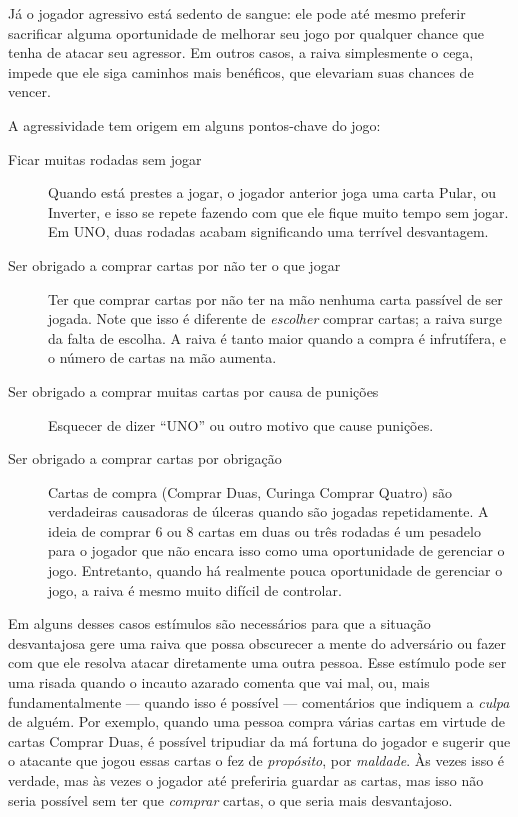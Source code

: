 Já o jogador agressivo está sedento de sangue: ele pode até mesmo preferir sacrificar alguma oportunidade de melhorar seu jogo por qualquer chance que tenha de atacar seu agressor. Em outros casos, a raiva simplesmente o cega, impede que ele siga caminhos mais benéficos, que elevariam suas chances de vencer.

A agressividade tem origem em alguns pontos-chave do jogo:

\begin{description}
\item[Ficar muitas rodadas sem jogar]{Quando está prestes a jogar, o jogador anterior joga uma carta Pular, ou Inverter, e isso se repete fazendo com que ele fique muito tempo sem jogar. Em UNO, duas rodadas acabam significando uma terrível desvantagem.}
\item[Ser obrigado a comprar cartas por não ter o que jogar]{Ter que comprar cartas por não ter na mão nenhuma carta passível de ser jogada. Note que isso é diferente de \textit{escolher} comprar cartas; a raiva surge da falta de escolha. A raiva é tanto maior quando a compra é infrutífera, e o número de cartas na mão aumenta.}
\item[Ser obrigado a comprar muitas cartas por causa de punições]{Esquecer de dizer ``UNO'' ou outro motivo que cause punições.}
\item[Ser obrigado a comprar cartas por obrigação]{Cartas de compra (Comprar Duas, Curinga Comprar Quatro) são verdadeiras causadoras de úlceras quando são jogadas repetidamente. A ideia de comprar 6 ou 8 cartas em duas ou três rodadas é um pesadelo para o jogador que não encara isso como uma oportunidade de gerenciar o jogo. Entretanto, quando há realmente pouca oportunidade de gerenciar o jogo, a raiva é mesmo muito difícil de controlar.}
\end{description}

Em alguns desses casos estímulos são necessários para que a situação desvantajosa gere uma raiva que possa obscurecer a mente do adversário ou fazer com que ele resolva atacar diretamente uma outra pessoa. Esse estímulo pode ser uma risada quando o incauto azarado comenta que vai mal, ou, mais fundamentalmente --- quando isso é possível --- comentários que indiquem a \textit{culpa} de alguém. Por exemplo, quando uma pessoa compra várias cartas em virtude de cartas Comprar Duas, é possível tripudiar da má fortuna do jogador e sugerir que o atacante que jogou essas cartas o fez de \textit{propósito}, por \textit{maldade}. Às vezes isso é verdade, mas às vezes o jogador até preferiria guardar as cartas, mas isso não seria possível sem ter que \textit{comprar} cartas, o que seria mais desvantajoso.

